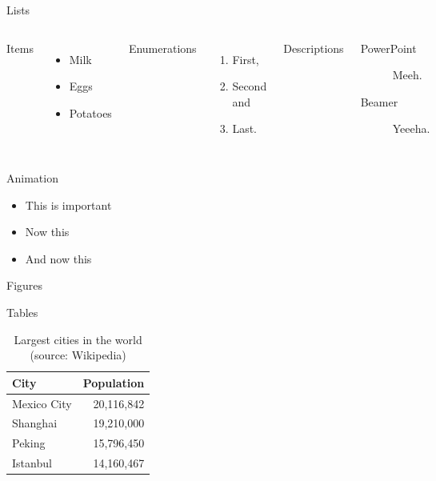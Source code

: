 \documentclass[10pt]{beamer}
\begin{document}
\begin{frame}{Lists}
  \begin{columns}[T,onlytextwidth]
      Items
      \begin{itemize}
        \item Milk \item Eggs \item Potatoes
      \end{itemize}

      Enumerations
      \begin{enumerate}
        \item First, \item Second and \item Last.
      \end{enumerate}

      Descriptions
      \begin{description}
        \item[PowerPoint] Meeh. \item[Beamer] Yeeeha.
      \end{description}
  \end{columns}
\end{frame}
\begin{frame}{Animation}
  \begin{itemize}[<+- | alert@+>]
    \item \alert<4>{This is important}
    \item Now this
    \item And now this
  \end{itemize}
\end{frame}
\begin{frame}{Figures}

\end{frame}
\begin{frame}{Tables}
  \begin{table}
    \caption{Largest cities in the world (source: Wikipedia)}
    \begin{tabular}{@{} lr @{}}
      \toprule
      City & Population\\
      \midrule
      Mexico City & 20,116,842\\
      Shanghai & 19,210,000\\
      Peking & 15,796,450\\
      Istanbul & 14,160,467\\
      \bottomrule
    \end{tabular}
  \end{table}
\end{frame}
\end{document}
